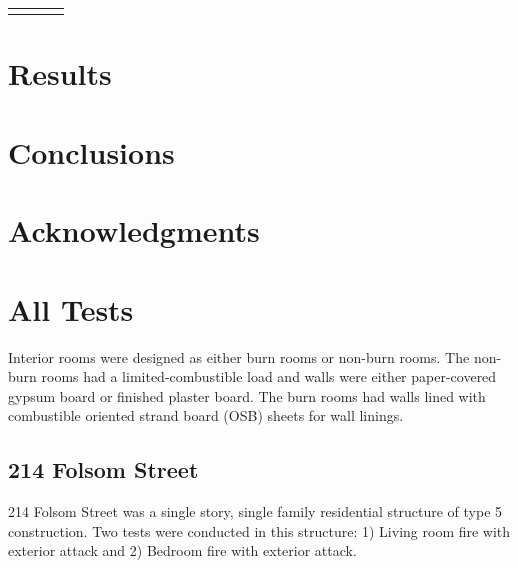 \documentclass[12pt,oneside]{book}
\begin{document}
\begin{table}
\begin{tabular}{llcc}
\noalign{\smallskip}\hline
\end{tabular}
\label{tab:Fuel_Masses}
\end{table}

\chapter{Results}
\label{chap:Results}


\clearpage


\chapter{Conclusions}
\label{chap:Conclusions}

\chapter{Acknowledgments}
\label{chap:Acknowledgments}



\appendix

\chapter{All Tests}

Interior rooms were designed as either burn rooms or non-burn rooms. The non-burn rooms had a limited-combustible load and walls were either paper-covered gypsum board or finished plaster board. The burn rooms had walls lined with combustible oriented strand board (OSB) sheets for wall linings.

\section{214 Folsom Street}

214 Folsom Street was a single story, single family residential structure of type 5 construction.  Two tests were conducted in this structure: 1) Living room fire with exterior attack and 2) Bedroom fire with exterior attack.
\end{document}
